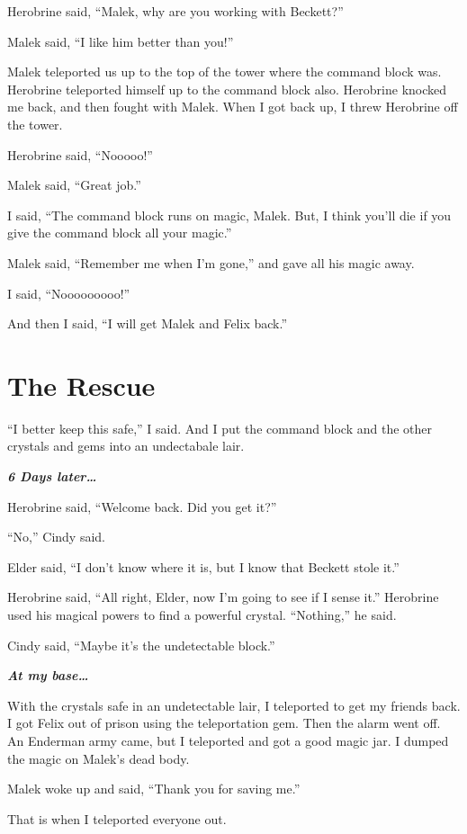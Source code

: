 \documentclass[12pt,oneside]{krantz}
\begin{document}
Herobrine said, ``Malek, why are you working with Beckett?''

Malek said, ``I like him better than you!''

Malek teleported us up to the top of the tower where the command block
was. Herobrine teleported himself up to the command block also.
Herobrine knocked me back, and then fought with Malek. When I got back
up, I threw Herobrine off the tower.

Herobrine said, ``Nooooo!''

Malek said, ``Great job.''

I said, ``The command block runs on magic, Malek. But, I think you'll
die if you give the command block all your magic.''

Malek said, ``Remember me when I'm gone,'' and gave all his magic away.

I said, ``Nooooooooo!''

And then I said, ``I will get Malek and Felix back.''

\hypertarget{the-rescue}{%
\chapter{The Rescue}\label{the-rescue}}

``I better keep this safe,'' I said. And I put the command block and the
other crystals and gems into an undectabale lair.

\textbf{\emph{6 Days later\ldots{}}}

Herobrine said, ``Welcome back. Did you get it?''

``No,'' Cindy said.

Elder said, ``I don't know where it is, but I know that Beckett stole
it.''

Herobrine said, ``All right, Elder, now I'm going to see if I sense
it.'' Herobrine used his magical powers to find a powerful crystal.
``Nothing,'' he said.

Cindy said, ``Maybe it's the undetectable block.''

\textbf{\emph{At my base\ldots{}}}

With the crystals safe in an undetectable lair, I teleported to get my
friends back. I got Felix out of prison using the teleportation gem.
Then the alarm went off. An Enderman army came, but I teleported and got
a good magic jar. I dumped the magic on Malek's dead body.

Malek woke up and said, ``Thank you for saving me.''

That is when I teleported everyone out.
\end{document}
